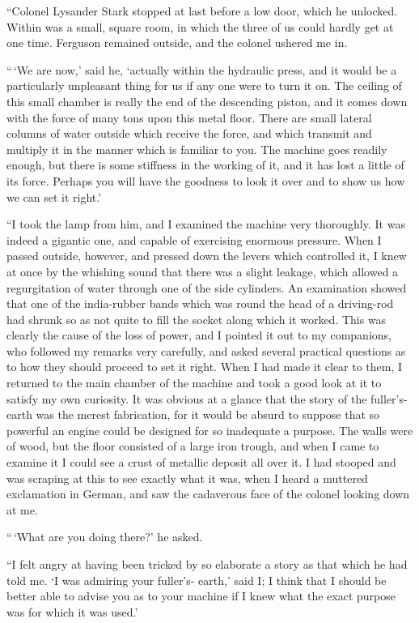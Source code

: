 “Colonel Lysander Stark stopped at last before a low door,
which he unlocked. Within was a small, square room, in
which the three of us could hardly get at one time. Ferguson
remained outside, and the colonel ushered me in.

“\,‘We are now,’ said he, ‘actually within the hydraulic
press, and it would be a particularly unpleasant thing for us
if any one were to turn it on. The ceiling of this small chamber
is really the end of the descending piston, and it comes
down with the force of many tons upon this metal floor.
There are small lateral columns of water outside which receive
the force, and which transmit and multiply it in the
manner which is familiar to you. The machine goes readily
enough, but there is some stiffness in the working of it, and
it has lost a little of its force. Perhaps you will have the
goodness to look it over and to show us how we can set it
right.’

“I took the lamp from him, and I examined the machine
very thoroughly. It was indeed a gigantic one, and capable
of exercising enormous pressure. When I passed outside,
however, and pressed down the levers which controlled it, I
knew at once by the whishing sound that there was a slight
leakage, which allowed a regurgitation of water through one
of the side cylinders. An examination showed that one of
the india-rubber bands which was round the head of a driving-rod
had shrunk so as not quite to fill the socket along which
it worked. This was clearly the cause of the loss of power,
and I pointed it out to my companions, who followed my
remarks very carefully, and asked several practical questions
as to how they should proceed to set it right. When I had
made it clear to them, I returned to the main chamber of the
machine and took a good look at it to satisfy my own curiosity.
It was obvious at a glance that the story of the fuller’s-earth
was the merest fabrication, for it would be absurd to suppose
that so powerful an engine could be designed for so inadequate
a purpose. The walls were of wood, but the floor
consisted of a large iron trough, and when I came to examine
it I could see a crust of metallic deposit all over it. I had
stooped and was scraping at this to see exactly what it was,
when I heard a muttered exclamation in German, and saw the
cadaverous face of the colonel looking down at me.

“\,‘What are you doing there?’ he asked.

“I felt angry at having been tricked by so elaborate a story
as that which he had told me. ‘I was admiring your fuller’s-%
earth,’ said I; I think that I should be better able to advise
you as to your machine if I knew what the exact purpose was
for which it was used.’

